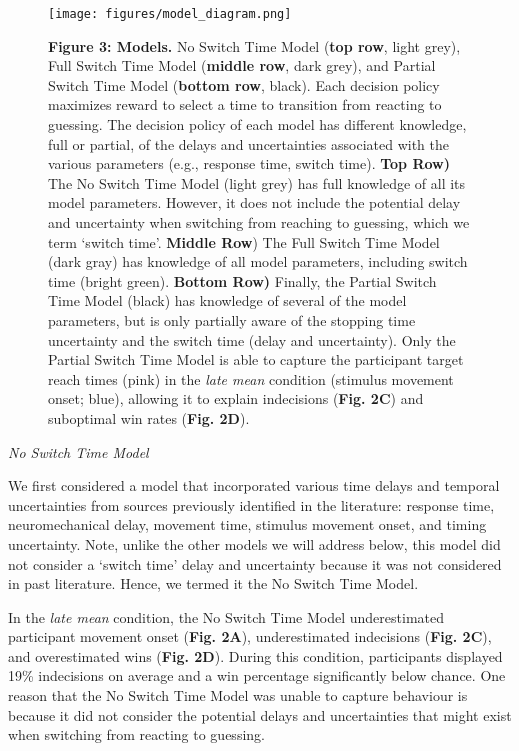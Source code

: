 \documentclass[12pt]{article}
\newcommand\boldblue[1]{\textcolor{mydarkblue}{\textbf{#1}}}
\begin{document}
\begin{figure}[H]
  \centering
  \texttt{[image: figures/model\_diagram.png]}

  \caption*{%
    \boldblue{Figure 3: Models.} No Switch Time Model (\boldblue{top row}, light grey), Full Switch Time Model (\boldblue{middle row}, dark grey), and Partial Switch Time Model (\boldblue{bottom row}, black). Each decision policy maximizes reward to select a time to transition from reacting to guessing. The decision policy of each model has different knowledge, full or partial, of the delays and uncertainties associated with the various parameters (e.g., response time, switch time). \boldblue{Top Row)} The No Switch Time Model (light grey) has full knowledge of all its model parameters. However, it does not include the potential delay and uncertainty when switching from reaching to guessing, which we term ‘switch time’.  \boldblue{Middle Row}) The Full Switch Time Model (dark gray) has knowledge of all model parameters, including switch time (bright green). \boldblue{Bottom Row)} Finally, the Partial Switch Time Model (black) has knowledge of several of the model parameters, but is only partially aware of the stopping time uncertainty and the switch time (delay and uncertainty). Only the Partial Switch Time Model is able to capture the participant target reach times (pink) in the \emph{late mean} condition (stimulus movement onset; blue), allowing it to explain indecisions (\boldblue{Fig. 2C}) and suboptimal win rates (\boldblue{Fig. 2D}).
    }
\end{figure}

\noindent\emph{{No Switch Time Model}}

\noindent We first considered a model that incorporated various time delays and temporal uncertainties from sources previously identified in the literature: response time, neuromechanical delay, movement time, stimulus movement onset, and timing uncertainty. Note, unlike the other models we will address below, this model did not consider a `switch time’ delay and uncertainty because it was not considered in past literature. Hence, we termed it the No Switch Time Model.

In the \emph{late mean} condition, the No Switch Time Model underestimated participant movement onset (\boldblue{Fig. 2A}), underestimated indecisions (\boldblue{Fig. 2C}), and overestimated wins (\boldblue{Fig. 2D}). During this condition, participants displayed 19\% indecisions on average and a win percentage significantly below chance. One reason that the No Switch Time Model was unable to capture behaviour is because it did not consider the potential delays and uncertainties that might exist when switching from reacting to guessing.
\end{document}
